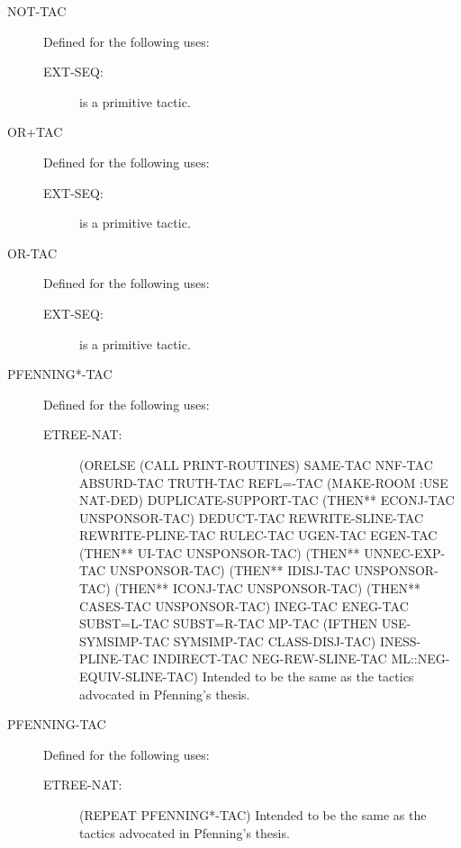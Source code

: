 \begin{description}
\begin{description}
\end{description}

\item[NOT-TAC]  Defined for the following uses:
\begin{description}
\item[EXT-SEQ:]  is a primitive tactic.

\end{description}

\item[OR+TAC]  Defined for the following uses:
\begin{description}
\item[EXT-SEQ:]  is a primitive tactic.

\end{description}

\item[OR-TAC]  Defined for the following uses:
\begin{description}
\item[EXT-SEQ:]  is a primitive tactic.

\end{description}

\item[PFENNING*-TAC]  Defined for the following uses:
\begin{description}
\item[ETREE-NAT:] 
(ORELSE (CALL PRINT-ROUTINES) SAME-TAC NNF-TAC ABSURD-TAC TRUTH-TAC
 REFL=-TAC (MAKE-ROOM :USE NAT-DED) DUPLICATE-SUPPORT-TAC
 (THEN** ECONJ-TAC UNSPONSOR-TAC) DEDUCT-TAC REWRITE-SLINE-TAC
 REWRITE-PLINE-TAC RULEC-TAC UGEN-TAC EGEN-TAC
 (THEN** UI-TAC UNSPONSOR-TAC) (THEN** UNNEC-EXP-TAC UNSPONSOR-TAC)
 (THEN** IDISJ-TAC UNSPONSOR-TAC) (THEN** ICONJ-TAC UNSPONSOR-TAC)
 (THEN** CASES-TAC UNSPONSOR-TAC) INEG-TAC ENEG-TAC SUBST=L-TAC
 SUBST=R-TAC MP-TAC (IFTHEN USE-SYMSIMP-TAC SYMSIMP-TAC CLASS-DISJ-TAC)
 INESS-PLINE-TAC INDIRECT-TAC NEG-REW-SLINE-TAC ML::NEG-EQUIV-SLINE-TAC)
Intended to be the same as the tactics advocated in Pfenning's thesis.

\end{description}

\item[PFENNING-TAC]  Defined for the following uses:
\begin{description}
\item[ETREE-NAT:] 
(REPEAT PFENNING*-TAC)
Intended to be the same as the tactics advocated in Pfenning's thesis.


\end{description}
\end{description}
